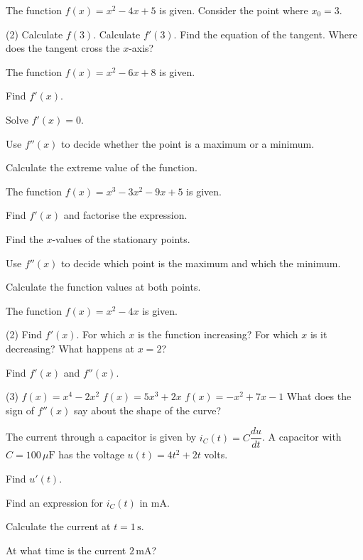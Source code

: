 The function $f(x) = x^2 - 4x + 5$ is given. Consider the point where $x_0 = 3$.
\begin{delar}(2)
  \task Calculate $f(3)$.
  \task Calculate $f'(3)$.
  \task Find the equation of the tangent.
  \task Where does the tangent cross the $x$-axis?
\end{delar}

The function $f(x) = x^2 - 6x + 8$ is given.
\begin{parts}
  \item Find $f'(x)$.
  \item Solve $f'(x) = 0$.
  \item Use $f''(x)$ to decide whether the point is a maximum or a minimum.
  \item Calculate the extreme value of the function.
\end{parts}

The function $f(x) = x^3 - 3x^2 - 9x + 5$ is given.
\begin{parts}
  \item Find $f'(x)$ and factorise the expression.
  \item Find the $x$-values of the stationary points.
  \item Use $f''(x)$ to decide which point is the maximum and which the minimum.
  \item Calculate the function values at both points.
\end{parts}

The function $f(x) = x^2 - 4x$ is given.
\begin{delar}(2)
  \task Find $f'(x)$.
  \task For which $x$ is the function increasing?
  \task For which $x$ is it decreasing?
  \task What happens at $x = 2$?
\end{delar}

Find $f'(x)$ and $f''(x)$.
\begin{delar}(3)
  \task $f(x) = x^4 - 2x^2$
  \task $f(x) = 5x^3 + 2x$
  \task $f(x) = -x^2 + 7x - 1$
  \task* What does the sign of $f''(x)$ say about the shape of the curve?
\end{delar}

The current through a capacitor is given by $i_C(t) = C\dfrac{du}{dt}$. A capacitor with
$C = 100\,\mu\text{F}$ has the voltage $u(t) = 4t^2 + 2t$ volts.
\begin{parts}
  \item Find $u'(t)$.
  \item Find an expression for $i_C(t)$ in mA.
  \item Calculate the current at $t = 1\,\text{s}$.
  \item At what time is the current $2\,\text{mA}$?
\end{parts}

